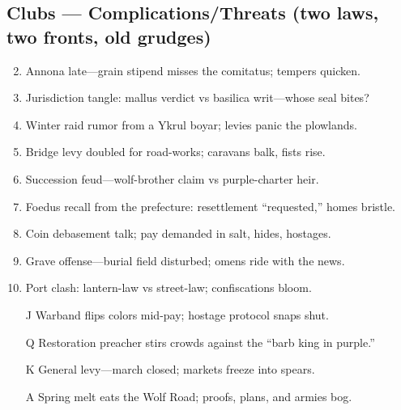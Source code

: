 \subsection*{Clubs --- Complications/Threats (two laws, two fronts, old grudges)}
\label{sec:vilikari-complications}
\begin{enumerate}
\setcounter{enumi}{1}
\item Annona late---grain stipend misses the comitatus; tempers quicken.
\item Jurisdiction tangle: mallus verdict vs basilica writ---whose seal bites?
\item Winter raid rumor from a Ykrul boyar; levies panic the plowlands.
\item Bridge levy doubled for road-works; caravans balk, fists rise.
\item Succession feud---wolf-brother claim vs purple-charter heir.
\item Foedus recall from the prefecture: resettlement ``requested,'' homes bristle.
\item Coin debasement talk; pay demanded in salt, hides, hostages.
\item Grave offense---burial field disturbed; omens ride with the news.
\item Port clash: lantern-law vs street-law; confiscations bloom.
\item[J] Warband flips colors mid-pay; hostage protocol snaps shut.
\item[Q] Restoration preacher stirs crowds against the ``barb king in purple.''
\item[K] General levy---march closed; markets freeze into spears.
\item[A] Spring melt eats the Wolf Road; proofs, plans, and armies bog.
\end{enumerate}


